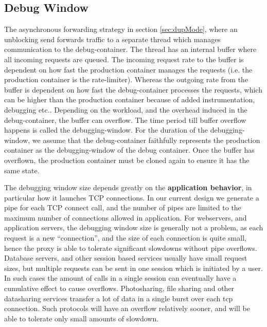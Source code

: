 
\subsection{Debug Window}
\label{sec:window}

\noindent
The asynchronous forwarding strategy in section \ref{sec:dupMode}, where an unblocking send forwards traffic to a separate thread which manages communication to the debug-container. 
The thread has an internal buffer where all incoming requests are queued. 
The incoming request rate to the buffer is dependent on how fast the production container manages the requests (i.e. the production container is the rate-limiter).
Whereas the outgoing rate from the buffer is dependent on how fast the debug-container processes the requests, which can be higher than the production container because of added instrumentation, debugging etc..
Depending on the workload, and the overhead induced in the debug-container, the buffer can overflow. 
The time period till buffer overflow happens is called the debugging-window.
For the duration of the debugging-window, we assume that the debug-container faithfully represents the production container as the debugging-window of the debug container. 
Once the buffer has overflown, the production container must be cloned again to ensure it has the same state.

\noindent
The debugging window size depends greatly on the \textbf{application behavior}, in particular how it launches TCP connections. 
In our current design we generate a pipe for each TCP connect call, and the number of pipes are limited to the maximum number of connections allowed in application.
For webservers, and application servers, the debugging window size is generally not a problem, as each request is a new ``connection'', and the size of each connection is quite small, hence the proxy is able to tolerate significant slowdowns without pipe overflows.
Database servers, and other session based services usually have small request sizes, but multiple requests can be sent in one session which is initiated by a user. In such cases the amount of calls in a single session can eventually have a cumulative effect to cause overflows.
Photosharing, file sharing and other datasharing services transfer a lot of data in a single burst over each tcp connection. Such protocols will have an overflow relatively sooner, and will be able to tolerate only small amounts of slowdown. 

